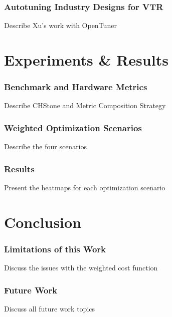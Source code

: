 \documentclass[10pt, compress, aspectratio=169]{beamer}
\begin{document}
\begin{frame}
    \frametitle{Autotuning Industry Designs for VTR}
    \begin{block}{Describe Xu's work with OpenTuner}
    \end{block}
\end{frame}

\section{Experiments \& Results}

\begin{frame}
    \frametitle{Benchmark and Hardware Metrics}
    \begin{block}{Describe CHStone and Metric Composition Strategy}
    \end{block}
\end{frame}

\begin{frame}
    \frametitle{Weighted Optimization Scenarios}
    \begin{block}{Describe the four scenarios}
    \end{block}
\end{frame}

\begin{frame}
    \frametitle{Results}
    \begin{block}{Present the heatmaps for each optimization scenario}
    \end{block}
\end{frame}

\section{Conclusion}

\begin{frame}
    \frametitle{Limitations of this Work}
    \begin{block}{Discuss the issues with the weighted cost function}
    \end{block}
\end{frame}

\begin{frame}
    \frametitle{Future Work}
    \begin{block}{Discuss all future work topics}
    \end{block}
\end{frame}

\maketitle
\end{document}
